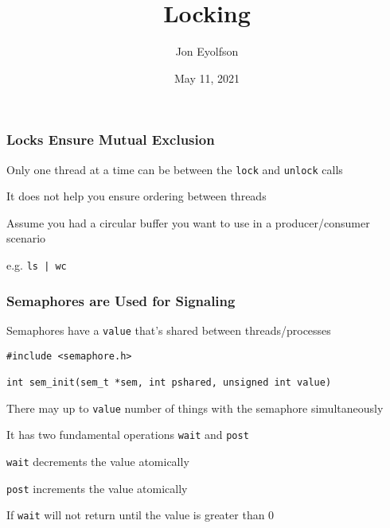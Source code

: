 

\title{Locking}
\author{Jon Eyolfson}
\date{May 11, 2021}


  \begin{frame}
    \titlepage
  \end{frame}

  \begin{frame}
    \frametitle{Locks Ensure Mutual Exclusion}

    Only one thread at a time can be between the \texttt{lock} and
    \texttt{unlock} calls

    \vspace{2em}

    It does not help you ensure ordering between threads

    \vspace{2em}

    Assume you had a circular buffer you want to use in a producer/consumer
    scenario

    \hspace{2em} e.g. \texttt{ls | wc}
  \end{frame}

  \begin{frame}[fragile]
    \frametitle{Semaphores are Used for Signaling}

    Semaphores have a {\tt value} that's shared between threads/processes

    \vspace{2em}

    \begin{lstlisting}
#include <semaphore.h>

int sem_init(sem_t *sem, int pshared, unsigned int value)
    \end{lstlisting}

    \vspace{2em}

    There may up to \texttt{value} number of things with the semaphore
    simultaneously

    \vspace{2em}

    It has two fundamental operations {\tt wait} and {\tt post}

    \hspace{2em} \texttt{wait} decrements the value atomically

    \hspace{2em} \texttt{post} increments the value atomically

    \vspace{2em}

    If \texttt{wait} will not return until the value is greater than 0
  \end{frame}

